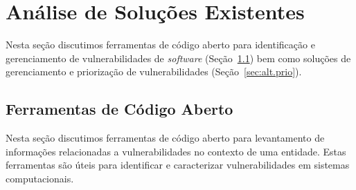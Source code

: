 
\section{Análise de Soluções Existentes}\label{sec:alt}

Nesta seção discutimos ferramentas de código aberto para identificação e gerenciamento de vulnerabilidades de \emph{software} (Seção~\ref{sec:alt.open}) bem como soluções de gerenciamento e priorização de vulnerabilidades (Seção~\ref{sec:alt.prio}).

\subsection{Ferramentas de Código Aberto}\label{sec:alt.open}

Nesta seção discutimos ferramentas de código aberto para levantamento de informações relacionadas a vulnerabilidades no contexto de uma entidade. Estas ferramentas são úteis para identificar e caracterizar vulnerabilidades em sistemas computacionais.

